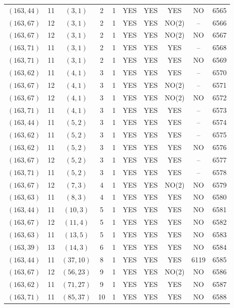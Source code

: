 \begin{longtable}{|c|c|c|c|c|c|c|c|c|c|}
$(163, 44)$ & 11 & $(3, 1)$ & 2 & 1 & YES & YES & YES & NO & 6565\\
$(163, 67)$ & 12 & $(3, 1)$ & 2 & 1 & YES & YES & NO(2) & -- & 6566\\
$(163, 67)$ & 12 & $(3, 1)$ & 2 & 1 & YES & YES & NO(2) & NO & 6567\\
$(163, 71)$ & 11 & $(3, 1)$ & 2 & 1 & YES & YES & YES & -- & 6568\\
$(163, 71)$ & 11 & $(3, 1)$ & 2 & 1 & YES & YES & YES & NO & 6569\\
$(163, 62)$ & 11 & $(4, 1)$ & 3 & 1 & YES & YES & YES & -- & 6570\\
$(163, 67)$ & 12 & $(4, 1)$ & 3 & 1 & YES & YES & NO(2) & -- & 6571\\
$(163, 67)$ & 12 & $(4, 1)$ & 3 & 1 & YES & YES & NO(2) & NO & 6572\\
$(163, 71)$ & 11 & $(4, 1)$ & 3 & 1 & YES & YES & YES & -- & 6573\\
$(163, 44)$ & 11 & $(5, 2)$ & 3 & 1 & YES & YES & YES & -- & 6574\\
$(163, 62)$ & 11 & $(5, 2)$ & 3 & 1 & YES & YES & YES & -- & 6575\\
$(163, 62)$ & 11 & $(5, 2)$ & 3 & 1 & YES & YES & YES & NO & 6576\\
$(163, 67)$ & 12 & $(5, 2)$ & 3 & 1 & YES & YES & YES & -- & 6577\\
$(163, 71)$ & 11 & $(5, 2)$ & 3 & 1 & YES & YES & YES & -- & 6578\\
$(163, 67)$ & 12 & $(7, 3)$ & 4 & 1 & YES & YES & NO(2) & NO & 6579\\
$(163, 63)$ & 11 & $(8, 3)$ & 4 & 1 & YES & YES & YES & NO & 6580\\
$(163, 44)$ & 11 & $(10, 3)$ & 5 & 1 & YES & YES & YES & NO & 6581\\
$(163, 67)$ & 12 & $(11, 4)$ & 5 & 1 & YES & YES & YES & NO & 6582\\
$(163, 63)$ & 11 & $(13, 5)$ & 5 & 1 & YES & YES & YES & NO & 6583\\
$(163, 39)$ & 13 & $(14, 3)$ & 6 & 1 & YES & YES & YES & NO & 6584\\
$(163, 44)$ & 11 & $(37, 10)$ & 8 & 1 & YES & YES & YES & 6119 & 6585\\
$(163, 67)$ & 12 & $(56, 23)$ & 9 & 1 & YES & YES & NO(2) & NO & 6586\\
$(163, 62)$ & 11 & $(71, 27)$ & 9 & 1 & YES & YES & YES & NO & 6587\\
$(163, 71)$ & 11 & $(85, 37)$ & 10 & 1 & YES & YES & YES & NO & 6588\\

\end{longtable}
